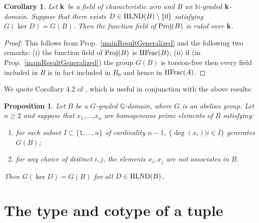 \documentclass[12pt]{amsart}
\theoremstyle{plain}
\newtheorem{proposition}[subsection]{Proposition}
\newtheorem{corollary}[subsection]{Corollary}
\theoremstyle{definition}
\newcommand{\Proj}{		\operatorname{{\rm Proj}}}
\newcommand{\HFrac}{		\operatorname{{\rm HFrac}}}
\newcommand{\Nat}{\ensuremath{\mathbb{N}}}
\newcommand{\Rat}{\ensuremath{\mathbb{Q}}}
\newcommand{\bk}{{\ensuremath{\rm \bf k}}}
\newcommand{\ggoth}{\mathfrak{g}}
\newcommand{\hlnd}{\operatorname{{\rm HLND}}}
\begin{document}
	\begin{corollary} \label{mainResult}
		Let $\bk$ be a field of characteristic zero and $B$ an $\Nat$-graded $\bk$-domain.
		Suppose that there exists $D \in \hlnd(B) \setminus \{0\}$ satisfying $G( \ker D ) = G(B)$.
		Then the function field of $\Proj(B)$ is ruled over $\bk$.
	\end{corollary}
	
	\begin{proof}
		This follows from Prop.\ \ref{mainResultGeneralized} and the following two remarks:
		(i) the function field of $\Proj(B)$ is $\HFrac(B)$;
		(ii) if (in Prop.\ \ref{mainResultGeneralized}) the group $G(B)$ is torsion-free then every field included in $B$ is in fact included in $B_0$
		and hence in $\HFrac(A)$.
	\end{proof}
	
	
	We quote Corollary 4.2 of \cite{daigle:hal-01691491}, which is useful in conjunction with the above results:
	
	\begin{proposition} Let $B$ be a $G$-graded $\Rat$-domain, where $G$ is an abelian group.
		Let $n \geq 2$ and suppose that $x_1$,...,$x_n$ are homogeneous prime elements of $B$ satisfying:
		\begin{enumerate}
			
			\item[(i)] for each subset $I \subset \{1,...,n\}$ of cardinality $n - 1$, $\{ \deg(x_i) | i \in I\}$ generates $G(B)$;  
			
			\item[(ii)] for any choice of distinct $i,j$, the elements $x_i, x_j$ are not associates in $B$.
			
		\end{enumerate}
		Then $G(\ker D) = G(B)$ for all $D  \in \hlnd(B)$.
	\end{proposition}
	
	
	\section{The type and cotype of a tuple}
	
	
\end{document}
